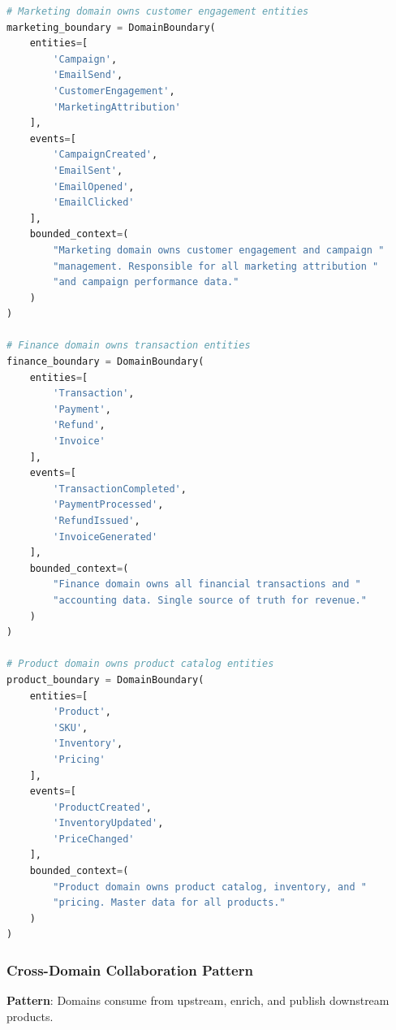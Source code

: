 \begin{lstlisting}[language=Python, caption={Entity-Based Domain Boundaries}]
# Marketing domain owns customer engagement entities
marketing_boundary = DomainBoundary(
    entities=[
        'Campaign',
        'EmailSend',
        'CustomerEngagement',
        'MarketingAttribution'
    ],
    events=[
        'CampaignCreated',
        'EmailSent',
        'EmailOpened',
        'EmailClicked'
    ],
    bounded_context=(
        "Marketing domain owns customer engagement and campaign "
        "management. Responsible for all marketing attribution "
        "and campaign performance data."
    )
)

# Finance domain owns transaction entities
finance_boundary = DomainBoundary(
    entities=[
        'Transaction',
        'Payment',
        'Refund',
        'Invoice'
    ],
    events=[
        'TransactionCompleted',
        'PaymentProcessed',
        'RefundIssued',
        'InvoiceGenerated'
    ],
    bounded_context=(
        "Finance domain owns all financial transactions and "
        "accounting data. Single source of truth for revenue."
    )
)

# Product domain owns product catalog entities
product_boundary = DomainBoundary(
    entities=[
        'Product',
        'SKU',
        'Inventory',
        'Pricing'
    ],
    events=[
        'ProductCreated',
        'InventoryUpdated',
        'PriceChanged'
    ],
    bounded_context=(
        "Product domain owns product catalog, inventory, and "
        "pricing. Master data for all products."
    )
)
\end{lstlisting}

\subsubsection{Cross-Domain Collaboration Pattern}

\textbf{Pattern}: Domains consume from upstream, enrich, and publish downstream products.

